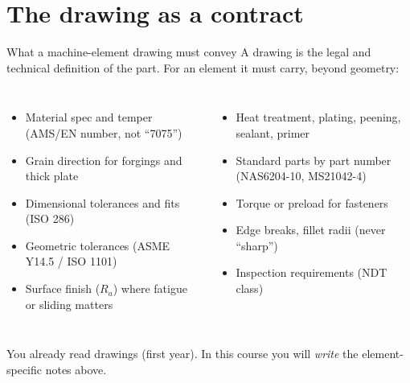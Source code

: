 \documentclass[aspectratio=169,10pt]{beamer}
\begin{document}
\section{The drawing as a contract}

\begin{frame}{What a machine-element drawing must convey}
A drawing is the legal and technical definition of the part. For an element it must carry, beyond geometry:
\begin{columns}[T]
\begin{itemize}
  \item Material spec and temper (AMS/EN number, not ``7075'')
  \item Grain direction for forgings and thick plate
  \item Dimensional tolerances and \alert{fits} (ISO 286)
  \item Geometric tolerances (ASME Y14.5 / ISO 1101)
  \item Surface finish ($R_a$) where fatigue or sliding matters
\end{itemize}
\begin{itemize}
  \item Heat treatment, plating, peening, sealant, primer
  \item Standard parts by part number (NAS6204-10, MS21042-4)
  \item Torque or preload for fasteners
  \item Edge breaks, fillet radii (never ``sharp'')
  \item Inspection requirements (NDT class)
\end{itemize}
\end{columns}
\vspace{4pt}
\small You already read drawings (first year). In this course you will \emph{write} the element-specific notes above.
\end{frame}
\end{document}
